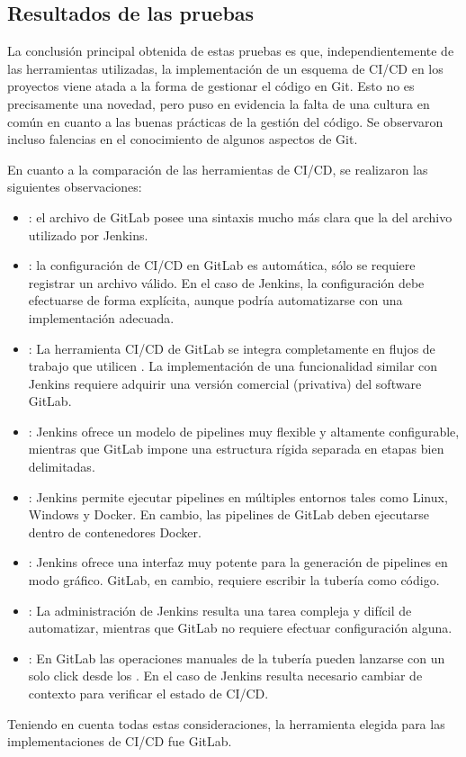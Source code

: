 \subsection{Resultados de las pruebas}
%
La conclusión principal obtenida de estas pruebas es que,
independientemente de las herramientas utilizadas, la implementación
de un esquema de CI/CD en los proyectos viene atada a la forma de
gestionar el código en Git. Esto no es precisamente una novedad, pero
puso en evidencia la falta de una cultura en común en cuanto a las
buenas prácticas de la gestión del código. Se observaron incluso
falencias en el conocimiento de algunos aspectos de Git.

En cuanto a la comparación de las herramientas de CI/CD, se realizaron
las siguientes observaciones:
%
\begin{itemize}
\item {}: el archivo  de GitLab posee
  una sintaxis mucho más clara que la del archivo 
  utilizado por Jenkins.
\item {}: la configuración de CI/CD en GitLab es
  automática, sólo se requiere registrar un archivo
   válido. En el caso de Jenkins, la
  configuración debe efectuarse de forma explícita, aunque podría
  automatizarse con una implementación adecuada.
\item {}: La herramienta CI/CD de GitLab se integra
  completamente en flujos de trabajo que utilicen . La implementación de una funcionalidad similar con
  Jenkins requiere adquirir una versión comercial (privativa) del
  software GitLab.
\item {}: Jenkins ofrece un modelo de pipelines muy
  flexible y altamente configurable, mientras que GitLab impone una
  estructura rígida separada en etapas bien delimitadas.
\item {}: Jenkins permite ejecutar pipelines en
  múltiples entornos tales como Linux, Windows y Docker. En cambio,
  las pipelines de GitLab deben ejecutarse dentro de contenedores
  Docker.
\item {}: Jenkins ofrece una interfaz muy
  potente para la generación de pipelines en modo gráfico. GitLab, en
  cambio, requiere escribir la tubería como código.
\item {}: La administración de Jenkins resulta una
  tarea compleja y difícil de automatizar, mientras que GitLab no
  requiere efectuar configuración alguna.
\item {}: En GitLab las operaciones manuales de la
  tubería pueden lanzarse con un solo click desde los . En el caso de Jenkins resulta necesario cambiar de
  contexto para verificar el estado de CI/CD.
\end{itemize}
%
Teniendo en cuenta todas estas consideraciones, la herramienta elegida
para las implementaciones de CI/CD fue GitLab.
%
